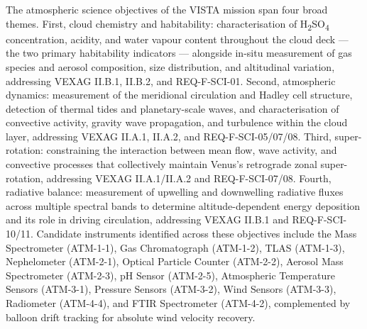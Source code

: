 The atmospheric science objectives of the VISTA mission span four broad themes. First, cloud chemistry and habitability: characterisation of H\textsubscript{2}SO\textsubscript{4} concentration, acidity, and water vapour content throughout the cloud deck — the two primary habitability indicators — alongside in-situ measurement of gas species and aerosol composition, size distribution, and altitudinal variation, addressing VEXAG II.B.1, II.B.2, and REQ-F-SCI-01. Second, atmospheric dynamics: measurement of the meridional circulation and Hadley cell structure, detection of thermal tides and planetary-scale waves, and characterisation of convective activity, gravity wave propagation, and turbulence within the cloud layer, addressing VEXAG II.A.1, II.A.2, and REQ-F-SCI-05/07/08. Third, super-rotation: constraining the interaction between mean flow, wave activity, and convective processes that collectively maintain Venus's retrograde zonal super-rotation, addressing VEXAG II.A.1/II.A.2 and REQ-F-SCI-07/08. Fourth, radiative balance: measurement of upwelling and downwelling radiative fluxes across multiple spectral bands to determine altitude-dependent energy deposition and its role in driving circulation, addressing VEXAG II.B.1 and REQ-F-SCI-10/11. Candidate instruments identified across these objectives include the Mass Spectrometer (ATM-1-1), Gas Chromatograph (ATM-1-2), TLAS (ATM-1-3), Nephelometer (ATM-2-1), Optical Particle Counter (ATM-2-2), Aerosol Mass Spectrometer (ATM-2-3), pH Sensor (ATM-2-5), Atmospheric Temperature Sensors (ATM-3-1), Pressure Sensors (ATM-3-2), Wind Sensors (ATM-3-3), Radiometer (ATM-4-4), and FTIR Spectrometer (ATM-4-2), complemented by balloon drift tracking for absolute wind velocity recovery.





